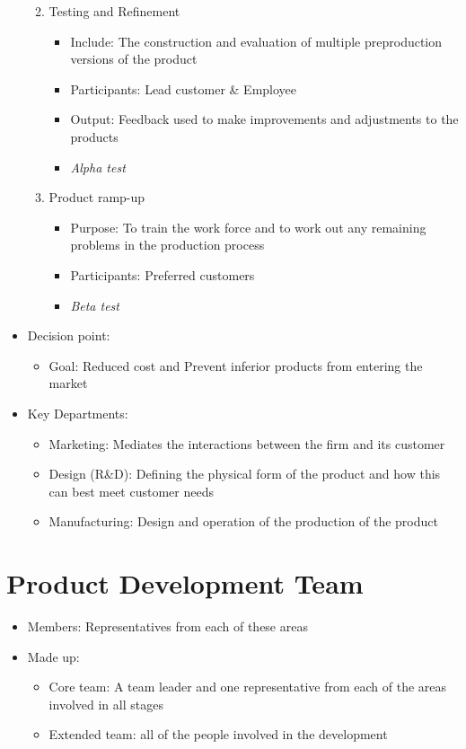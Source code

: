 \documentclass[openany,12pt,a4paper]{book}
\begin{document}
\begin{itemize}
\begin{enumerate}
\begin{itemize}
\begin{itemize}
            \end{itemize}
        \end{itemize}
        \item Testing and Refinement
        \begin{itemize}
            \item Include: The construction and evaluation of multiple preproduction versions of the product
            \item Participants: Lead customer \& Employee
            \item Output: Feedback used to make improvements and adjustments to the products
            \item \textit{Alpha test}
        \end{itemize}
        \item Product ramp-up
        \begin{itemize}
            \item Purpose: To train the work force and to work out any remaining problems in the production process
            \item Participants: Preferred customers
            \item \textit{Beta test}
        \end{itemize}
    \end{enumerate}
    \item Decision point:
    \begin{itemize}
        \item Goal: Reduced cost and Prevent inferior products from entering the market
    \end{itemize}
    \item Key Departments:
    \begin{itemize}
        \item Marketing: Mediates the interactions between the firm and its customer
        \item Design (R\&D): Defining the physical form of the product and how this can best meet customer needs
        \item Manufacturing: Design and operation of the production of the product
    \end{itemize}
\end{itemize}

\section{Product Development Team}
\begin{itemize}
    \item Members: Representatives from each of these areas
    \item Made up:
    \begin{itemize}
        \item Core team: A team leader and one representative from each of the areas involved in all stages
        \item Extended team: all of the people involved in the development
    \end{itemize}
\end{itemize}
\end{document}
